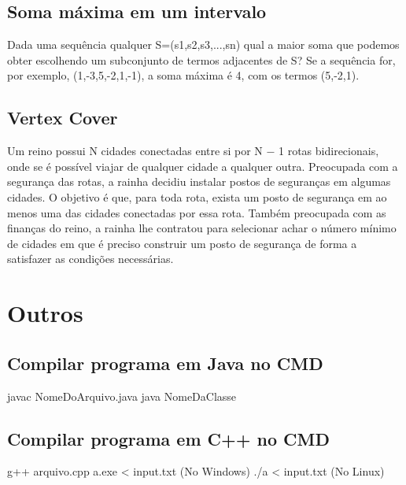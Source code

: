 \documentclass[a4paper,12pt]{article}
\begin{document}

\subsection{Soma máxima em um intervalo}
\indent Dada uma sequência qualquer S=(s1,s2,s3,...,sn) qual a maior soma que podemos obter escolhendo um subconjunto de termos adjacentes de S? Se a sequência for, por exemplo, (1,-3,5,-2,1,-1), a soma máxima é 4, com os termos (5,-2,1).


\subsection{Vertex Cover}
\indent Um reino possui N cidades conectadas entre si por N − 1 rotas bidirecionais, onde se é possível viajar de qualquer cidade a qualquer outra. Preocupada com a segurança das rotas, a rainha decidiu instalar postos de seguranças em algumas cidades. O objetivo é que, para toda rota, exista um posto de segurança em ao menos uma das cidades conectadas por essa rota. Também preocupada com as finanças do reino, a rainha lhe contratou para selecionar achar o número mínimo de cidades em que é preciso construir um posto de segurança de forma a satisfazer as condições necessárias.


\newpage

\section{Outros}

\subsection{Compilar programa em Java no CMD}
\noindent
javac NomeDoArquivo.java \newline
java NomeDaClasse

\subsection{Compilar programa em C++ no CMD}
\noindent
g++ arquivo.cpp \newline
a.exe < input.txt (No Windows) \newline
./a < input.txt (No Linux) 
\end{document}
